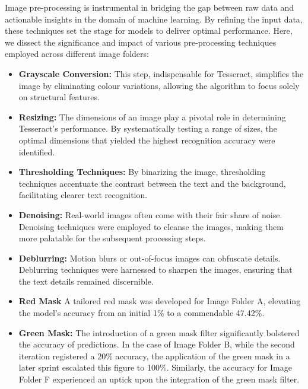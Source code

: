 Image pre-processing is instrumental in bridging the gap between raw data and actionable insights in the domain of machine learning. By refining the input data, these techniques set the stage for models to deliver optimal performance. Here, we dissect the significance and impact of various pre-processing techniques employed across different image folders:

\begin{itemize}
    \item \textbf{Grayscale Conversion:} This step, indispensable for Tesseract, simplifies the image by eliminating colour variations, allowing the algorithm to focus solely on structural features.

    \item \textbf{Resizing:} The dimensions of an image play a pivotal role in determining Tesseract's performance. By systematically testing a range of sizes, the optimal dimensions that yielded the highest recognition accuracy were identified.

    \item \textbf{Thresholding Techniques:} By binarizing the image, thresholding techniques accentuate the contrast between the text and the background, facilitating clearer text recognition.

    \item \textbf{Denoising:} Real-world images often come with their fair share of noise. Denoising techniques were employed to cleanse the images, making them more palatable for the subsequent processing steps.

    \item \textbf{Deblurring:} Motion blurs or out-of-focus images can obfuscate details. Deblurring techniques were harnessed to sharpen the images, ensuring that the text details remained discernible.

    \item \textbf{Red Mask} A tailored red mask was developed for Image Folder A, elevating the model's accuracy from an initial 1\% to a commendable 47.42\%.

    \item \textbf{Green Mask:} The introduction of a green mask filter significantly bolstered the accuracy of predictions. In the case of Image Folder B, while the second iteration registered a 20\% accuracy, the application of the green mask in a later sprint escalated this figure to 100\%. Similarly, the accuracy for Image Folder F experienced an uptick upon the integration of the green mask filter.

\end{itemize}

